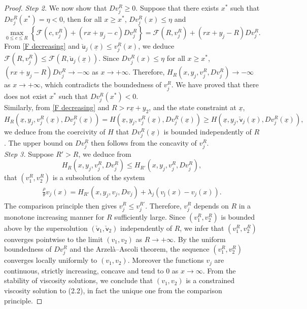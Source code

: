 \documentclass[11pt]{article}
\numberwithin{equation}{section}
\theoremstyle{definition}
\def\su{{\mathsf{u}}}
\def\sv{{\mathsf{v}}}
\newcommand{\ux}{{\underline x}}
\newcommand{\beq}{\begin{equation}}
\newcommand{\eeq}{\end{equation}}
\newcommand{\lc}{\left(}
\newcommand{\rc}{\right)}
\theoremstyle{plain}
\begin{document}
{\begin{proof}
{\it{Step 2.}} We now show that $Dv^R_j\geq 0$. Suppose that there exists $x^*$ such that $Dv^R_j(x^*)=\eta< 0$, then for all $x\geq x^*$, $Dv^R_j(x)\leq \eta$ and 
$$
\max_{0\leq c\leq R} \left\{ \mathcal{F}(c,v^R_j) +(rx +y_j- c)Dv^R_j \right\}=\mathcal{F}(R,v^R_j) +(rx +y_j- R)Dv^R_j .
$$
From \cref{F decreasing} and $\check{\su}_j(\ux)\leq v^R_j(x)$, we deduce $\mathcal{F}(R,v^R_j)\leq \mathcal{F}(R,\check{\su}_j(\ux))$. Since $Dv^R_j(x)\leq \eta$ for all $x\geq x^*$, $(rx +y_j- R)Dv^R_j\to -\infty$ as $x\to +\infty$. Therefore, $H_R\lc x,y_j,v^R_j,Dv^R_j\rc\to -\infty$ as $x\to +\infty$, which contradicts the boundedness of $v^R_j$. We have proved that there does not exist $x^*$ such that $Dv^R_j(x^*)< 0$. \\
\indent Similarly, from \cref{F decreasing} and $R>r\ux+y_2$, and the state constraint at $\ux$,
$$
H_R\lc \ux,y_j,v^R_j(\ux),Dv^R_j(\ux)\rc= H\lc \ux,y_j,v^R_j(\ux),Dv^R_j(\ux)\rc \geq H\lc \ux,y_j,\check{\sv}_j(\ux),Dv^R_j(\ux)\rc,
$$
we deduce from the coercivity of $H$ that $Dv^R_j(\ux)$ is bounded independently of $R$. The upper bound on $Dv^R_j$ then follows from the concavity of $v^R_j$. \\
{\it{Step 3.}} Suppose $R'>R$, we deduce from 
$$
H_R\lc x,y_j,v^R_j,Dv^R_j\rc\leq H_{R'}\lc x,y_j,v^R_j,Dv^R_j\rc,
$$
that $\lc v^R_1,v^R_2\rc $ is a subsolution of the system
\beq\label{Eq: HJB R'}
	\begin{aligned}
	\frac{\rho}{\theta} v_j(x)=H_{R'}(x,y_j,v_j,Dv_j)+\lambda_j(v_{\bar \jmath}(x)-v_j(x)).
	\end{aligned}
	\eeq
The comparison principle then gives $v^R_j\leq v^{R'}_j$. Therefore, $v^R_j$ depends on $R$ in a monotone increasing manner for $R$ sufficiently large. Since $\lc v^R_1,v^R_2\rc $ is bounded above by the supersolution $(\check{\sv}_1,\check{\sv}_2)$ independently of $R$, we infer that $\lc v^R_1,v^R_2\rc $ converges pointwise to the limit $\lc v_1,v_2\rc $ as $R\to +\infty$. By the uniform boundedness of $Dv^R_j$ and the Arzel\`a–Ascoli theorem, the sequence $\lc v^R_1,v^R_2\rc $ converges locally uniformly to $\lc v_1,v_2\rc $. Moreover the functions $v_j$ are continuous, strictly increasing, concave and tend to $0$ as $x\to \infty$. From the stability of viscosity solutions, we conclude that $(v_1,v_2)$ is a constrained viscosity solution to (2.2), in fact the unique one from the comparison principle. 
\end{proof}
}
\end{document}
